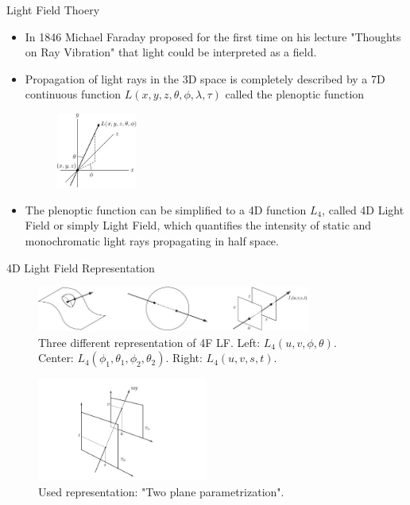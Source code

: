 \begin{frame}{Light Field Thoery}
\begin{block}{}
\begin{itemize}

\item In 1846 Michael Faraday proposed for the first time on his lecture "Thoughts on Ray Vibration" that light could be interpreted as a field.

\pause

\item Propagation of light rays in the 3D space is completely described by a 7D continuous function $L(x,y,z,\theta,\phi, \lambda, \tau)$ called the plenoptic function

\pause
\begin{figure}[h!]
\centering
\includegraphics[width=0.25\textwidth]{../../Diagrams/Plenoptic_function.jpg}
\end{figure}

\pause

\item The plenoptic function can be simplified to a 4D function $L_4$, called 4D Light Field or simply Light Field, which quantifies the intensity of static and monochromatic light rays propagating in half space. 
\end{itemize}
\end{block}
\end{frame}

\begin{frame}{4D Light Field Representation}
\begin{figure}[h!]
\includegraphics[width=0.8\textwidth]{../../Diagrams/Light-field-parametrizations.jpg}
\caption{Three different representation of 4F LF\@. Left: $L_4(u,v,\phi,\theta)$. Center: $L_4(\phi_1,\theta_1,\phi_2,\theta_2)$. Right: $L_4(u,v,s,t)$.}
\end{figure}
\pause
\begin{figure}[h!]
\centering
\includegraphics[width=0.5\textwidth]{../../Diagrams/two-planes_param.jpg}
\caption{Used representation: "Two plane parametrization".}
\label{fig:C2S0F3}
\end{figure}
\end{frame}

